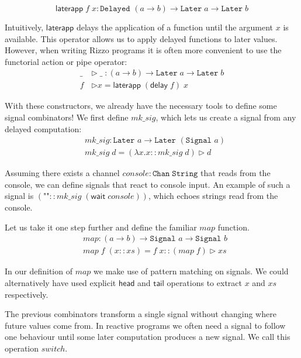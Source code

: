 \[\mathsf{laterapp} \; f \; x : \texttt{Delayed }(a \rightarrow b) \rightarrow \texttt{Later}\;a \rightarrow \texttt{Later}\;b\]

Intuitively, $\mathsf{laterapp}$ delays the application of a function until the argument $x$ is available. This operator allows us to apply delayed functions to later values. However, when writing Rizzo programs it is often more convenient to use the functorial action or pipe operator:
\begin{align*}
\_ \; &\triangleright \; \_ \; : (a \rightarrow b) \rightarrow \texttt{Later} \; a \rightarrow \texttt{Later} \; b \\
f &\triangleright x = \mathsf{laterapp} \; (\mathsf{delay} \; f) \; x
\end{align*}

With these constructors, we already have the necessary tools to define some signal combinators! We first define $mk\_sig$, which lets us create a signal from any delayed computation:
\begin{align*}
    &mk\_sig : \texttt{Later }a \rightarrow \texttt{Later }(\texttt{Signal }a) \\
    &mk\_sig \; d = (\lambda x. x :: mk\_sig \; d) \triangleright d
\end{align*}

Assuming there exists a channel $console : \texttt{Chan}\;\texttt{String}$ that reads from the console, we can define signals that react to console input. An example of such a signal is $(\text{""} :: mk\_sig \; (\mathsf{wait} \; console))$, which echoes strings read from the console.

Let us take it one step further and define the familiar $map$ function.
\begin{align*}
    &map : (a \rightarrow b) \rightarrow \texttt{Signal }a \rightarrow \texttt{Signal }b \\
    &map \; f \; (x :: xs) = f \; x :: (map \; f) \triangleright xs
\end{align*}

In our definition of $map$ we make use of pattern matching on signals. We could alternatively have used explicit $\mathsf{head}$ and $\mathsf{tail}$ operations to extract $x$ and $xs$ respectively.

The previous combinators transform a single signal without changing where future values come from. 
In reactive programs we often need a signal to follow one behaviour until some later computation produces a new signal. We call this operation $switch$.

